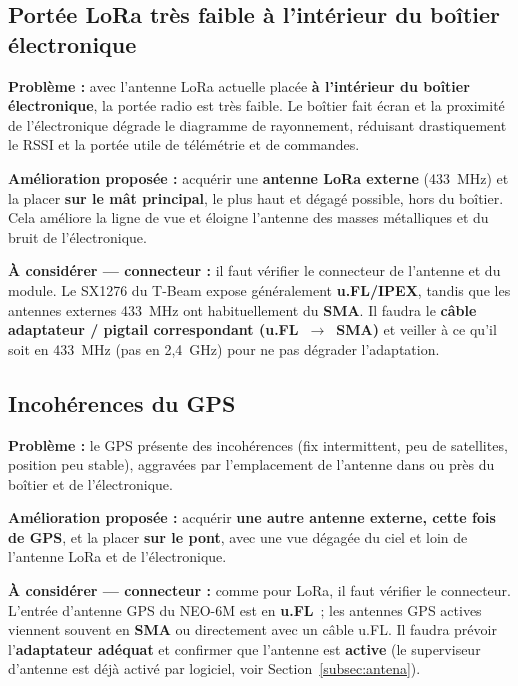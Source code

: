 \documentclass[12pt,a4paper]{article}
\begin{document}
\subsection{Port\'ee LoRa tr\`es faible à l'int\'erieur du bo\^itier \'electronique}

\begin{warningbox}
  \textbf{Probl\`eme :} avec l'antenne LoRa actuelle plac\'ee \textbf{à l'int\'erieur
  du bo\^itier \'electronique}, la port\'ee radio est tr\`es faible. Le bo\^itier fait
  \'ecran et la proximit\'e de l'\'electronique d\'egrade le diagramme de rayonnement,
  r\'eduisant drastiquement le RSSI et la port\'ee utile de t\'el\'em\'etrie et de
  commandes.
\end{warningbox}

\begin{okbox}
  \textbf{Am\'elioration propos\'ee :} acqu\'erir une \textbf{antenne LoRa externe}
  (433~MHz) et la placer \textbf{sur le m\^at principal}, le plus haut et d\'egag\'e
  possible, hors du bo\^itier. Cela am\'eliore la ligne de vue et \'eloigne l'antenne
  des masses m\'etalliques et du bruit de l'\'electronique.

  \textbf{À consid\'erer --- connecteur :} il faut v\'erifier le connecteur de
  l'antenne et du module. Le SX1276 du T-Beam expose g\'en\'eralement
  \textbf{u.FL/IPEX}, tandis que les antennes externes 433~MHz ont habituellement du
  \textbf{SMA}. Il faudra le \textbf{c\^able adaptateur / pigtail correspondant
  (u.FL~$\to$~SMA)} et veiller à ce qu'il soit en 433~MHz (pas en 2,4~GHz) pour ne pas
  d\'egrader l'adaptation.
\end{okbox}

\subsection{Incoh\'erences du GPS}

\begin{warningbox}
  \textbf{Probl\`eme :} le GPS pr\'esente des incoh\'erences (fix intermittent, peu de
  satellites, position peu stable), aggrav\'ees par l'emplacement de l'antenne dans ou
  pr\`es du bo\^itier et de l'\'electronique.
\end{warningbox}

\begin{okbox}
  \textbf{Am\'elioration propos\'ee :} acqu\'erir \textbf{une autre antenne externe,
  cette fois de GPS}, et la placer \textbf{sur le pont}, avec une vue d\'egag\'ee du
  ciel et loin de l'antenne LoRa et de l'\'electronique.

  \textbf{À consid\'erer --- connecteur :} comme pour LoRa, il faut v\'erifier le
  connecteur. L'entr\'ee d'antenne GPS du NEO-6M est en \textbf{u.FL}~; les antennes
  GPS actives viennent souvent en \textbf{SMA} ou directement avec un c\^able u.FL. Il
  faudra pr\'evoir l'\textbf{adaptateur ad\'equat} et confirmer que l'antenne est
  \textbf{active} (le superviseur d'antenne est d\'ej\`a activ\'e par logiciel, voir
  Section~\ref{subsec:antena}).
\end{okbox}
\end{document}
